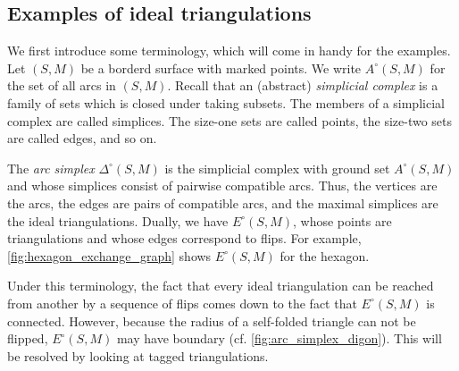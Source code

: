 \subsection{Examples of ideal triangulations}

We first introduce some terminology, which will come in handy for the examples. Let
$(S, M)$ be a borderd surface with marked points. We write $A^\circ(S, M)$ for the set of all arcs in $(S, M)$. Recall that an (abstract)
\emph{simplicial complex} is a family of sets which is closed
under taking subsets. The members of a simplicial complex are called simplices. The
size-one sets are called points, the size-two sets are called edges, and so on.

The \emph{arc simplex} $\Delta^\circ (S, M)$ is the simplicial complex with ground set $A^\circ(S, M)$ and
whose simplices consist of pairwise compatible arcs. Thus, the vertices are the arcs,
the edges are pairs of compatible arcs, and the maximal simplices are the ideal
triangulations. Dually, we have $E^\circ(S, M)$,
whose points are triangulations and whose edges correspond to flips. For example,
\cref{fig:hexagon_exchange_graph} shows $E^\circ(S, M)$ for the hexagon.

Under this terminology, the fact that every ideal triangulation can be reached from
another by a sequence of flips comes down to the fact that $E^\circ(S,M)$ is connected.
However, because the radius of a self-folded triangle can not be flipped, $E^\circ(S,
	M)$ may have boundary (cf. \cref{fig:arc_simplex_digon}). This will be resolved by
looking at tagged triangulations.

